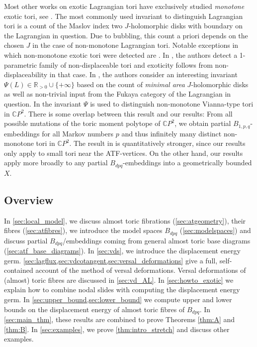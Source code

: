 \documentclass[12pt,a4paper,abstract=true,draft]{scrartcl}
\begin{document}
Most other works on exotic Lagrangian tori have exclusively studied \emph{monotone} exotic tori, see \cite{Aur15, Che96, CheSch10, EliPol97, GalMik22, Via17, Via16}.
The most commonly used invariant to distinguish Lagrangian tori is a count of the Maslov index two $J$-holomorphic disks with boundary on the Lagrangian in question.
Due to bubbling, this count a priori depends on the chosen $J$ in the case of non-monotone Lagrangian tori.
Notable exceptions in which non-monotone exotic tori were detected are \cite{FOOO12, SheTonVia19}.
In \cite{FOOO12}, the authors detect a 1-parametric family of non-displaceable tori and exoticity follows from non-displaceability in that case.
In \cite{SheTonVia19}, the authors consider an interesting invariant $\Psi(L) \in \mathbb{R}_{>0} \cup \{+\infty\}$ based on the count of \emph{minimal area} $J$-holomorphic disks as well as non-trivial input from the Fukaya category of the Lagrangian in question.
In \cite[Section 7]{SheTonVia19} the invariant $\Psi$ is used to distinguish non-monotone Vianna-type tori in $\mathbb{C}P^2$.
There is some overlap between this result and our results:
From all possible mutations of the toric moment polytope of $\mathbb{C}P^2$, we obtain partial $B_{1,p,q}$-embeddings for all Markov numbers $p$ and thus infinitely many distinct non-monotone tori in $\mathbb{C}P^2$.
The result in \cite[Section 7]{SheTonVia19} is quantitatively stronger, since our results only apply to small tori near the ATF-vertices.
On the other hand, our results apply more broadly to any partial $B_{dpq}$-embeddings into a geometrically bounded $X$.

\subsection{Overview}

In \cref{sec:local_model}, we discuss almost toric fibrations (\cref{sec:atgeometry}), their fibres (\cref{sec:atfibres}), we introduce the model spaces $B_{dpq}$ (\cref{sec:modelspaces}) and discuss partial $B_{dpq}$\-/embeddings coming from general almost toric base diagrams (\cref{sec:atf_base_diagrams}).
In \cref{sec:vds}, we introduce the displacement energy germ.
\cref{sec:lagflux,sec:vdcotangent,sec:versal_deformations} give a full, self-contained account of the method of versal deformations.
Versal deformations of (almost) toric fibres are discussed in \cref{sec:vd_AL}. In \cref{sec:howto_exotic} we explain how to combine nodal slides with computing the displacement energy germ.
In \cref{sec:upper_bound,sec:lower_bound} we compute upper and lower bounds on the displacement energy of almost toric fibres of $B_{dpq}$.
In \cref{sec:main_thm}, these results are combined to prove Theorems \ref{thm:A} and \ref{thm:B}.
In \cref{sec:examples}, we prove \cref{thm:intro_stretch} and discuss other examples.
\end{document}
